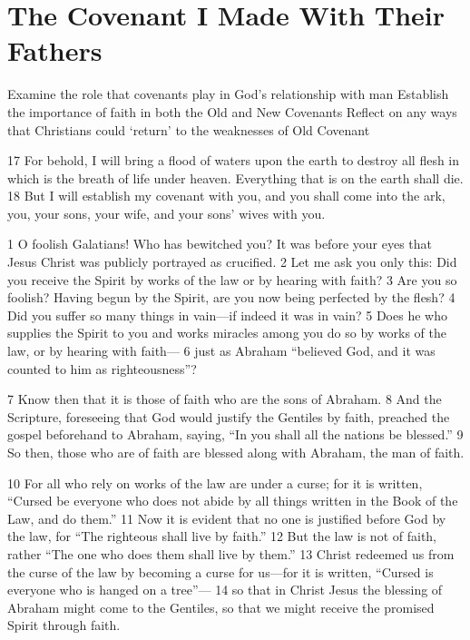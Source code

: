 \chapter{The Covenant I Made With Their Fathers}

\begin{goals}
\goal Examine the role that covenants play in God's relationship with man
\goal Establish the importance of faith in both the Old and New Covenants
\goal Reflect on any ways that Christians could `return' to the weaknesses of Old Covenant
\end{goals}

\begin{bible}


17 For behold, I will bring a flood of waters upon the earth to destroy all flesh in which is the breath of life under heaven. Everything that is on the earth shall die. 18 But I will establish my covenant with you, and you shall come into the ark, you, your sons, your wife, and your sons' wives with you.

1 O foolish Galatians! Who has bewitched you? It was before your eyes that Jesus Christ was publicly portrayed as crucified. 2 Let me ask you only this: Did you receive the Spirit by works of the law or by hearing with faith? 3 Are you so foolish? Having begun by the Spirit, are you now being perfected by the flesh? 4 Did you suffer so many things in vain—if indeed it was in vain? 5 Does he who supplies the Spirit to you and works miracles among you do so by works of the law, or by hearing with faith— 6 just as Abraham ``believed God, and it was counted to him as righteousness''?

7 Know then that it is those of faith who are the sons of Abraham. 8 And the Scripture, foreseeing that God would justify the Gentiles by faith, preached the gospel beforehand to Abraham, saying, ``In you shall all the nations be blessed.'' 9 So then, those who are of faith are blessed along with Abraham, the man of faith.

10 For all who rely on works of the law are under a curse; for it is written, ``Cursed be everyone who does not abide by all things written in the Book of the Law, and do them.'' 11 Now it is evident that no one is justified before God by the law, for ``The righteous shall live by faith.'' 12 But the law is not of faith, rather ``The one who does them shall live by them.'' 13 Christ redeemed us from the curse of the law by becoming a curse for us—for it is written, ``Cursed is everyone who is hanged on a tree''— 14 so that in Christ Jesus the blessing of Abraham might come to the Gentiles, so that we might receive the promised Spirit through faith.


\end{bible}
